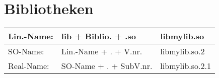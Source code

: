 \section{Bibliotheken}





\begin{tabular}{|l|l|l|}
\hline
   Lin.-Name:  & lib + Biblio. + .so & libmylib.so\\
   \hline
   SO-Name: & Lin.-Name + . + V.nr. & libmylib.so.2\\
   \hline
   Real-Name: & SO-Name + . + SubV.nr. & libmylib.so.2.1\\
   \hline
\end{tabular}
